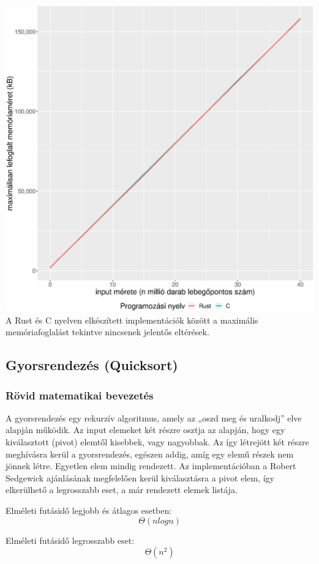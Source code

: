 \includegraphics[width=15.5cm]{kepek/shells_sort_memory.eps}
A Rust és C nyelven elkészített implementációk között a maximális memóriafoglalást tekintve nincsenek jelentős eltérések.

\subsection{Gyorsrendezés (Quicksort)}
\subsubsection{Rövid matematikai bevezetés}
A gyorsrendezés egy rekurzív algoritmus, amely az „oszd meg és uralkodj” elve alapján működik. Az input elemeket két részre osztja az alapján, hogy egy kiválasztott (pivot) elemtől kisebbek, vagy nagyobbak. Az így létrejött két részre meghívásra kerül a gyorsrendezés, egészen addig, amíg egy elemű részek nem jönnek létre. Egyetlen elem mindig rendezett. Az implementációban a Robert Sedgewick ajánlásának megfelelően kerül kiválasztásra a pivot elem, így elkerülhető a legrosszabb eset, a már rendezett elemek listája.

Elméleti futásidő legjobb és átlagos esetben:
\[\Theta(n log n) \]

Elméleti futásidő legrosszabb eset:
\[\Theta(n^2)\]
 
